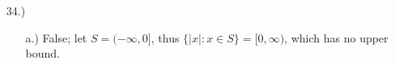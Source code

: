 \documentclass[12pt]{article}
\newcommand{\contradiction}{
    \ensuremath{{\Rightarrow\mspace{-2mu}\Leftarrow}}
}
\newcommand{\vertb}[1]{\left\vert#1\right\vert}
\begin{document}
\pagestyle{fancy}
\fancyhead{}

\normalsize
\begin{itemize}





    \item [34.)] \begin{itemize}
        \item [a.)] False; let $S=(-\infty,0]$, thus $\{\vert x\vert:x\in S\}=[0,\infty)$, which has no upper bound.


\end{itemize}
\end{itemize}
\end{document}
